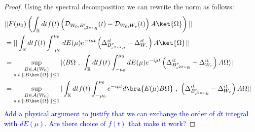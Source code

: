 \documentclass[a4paper,11pt]{article}
\theoremstyle{definition}
\theoremstyle{remark}
\newcommand{\lb}{\left(}
\newcommand{\rb}{\right)}
\newcommand{\NL}[1]{\textcolor{blue}{#1}}
\begin{document}
\begin{proof}
    Using the spectral decomposition we can rewrite the norm as follows:
    \begin{align}
        \begin{split}
            &||F(\mu_0)\lb\int_\mathbb{R} dt f(t)\lb \mathcal{D}_{W_0, B^r_{e^{2\pi s}R}}(t) - \mathcal{D}_{W_0, W_r}(t) \rb A\ket{\Omega}\rb||
            \\&= ||\int_\mathbb{R} dtf(t)\int_{-\mu_0}^{\mu_0}dE(\mu) e^{-i\mu t}\lb\Delta_{B^r_{e^{2\pi s}R}}^{it} - \Delta_{W_r}^{it}\rb A\ket{\Omega}||
            \\&
            =\sup_{\substack{B\in\mathcal{A}(W_0)\\s.t.||B\ket{\Omega}||\leq 1}}|\langle B\Omega\text{ , }\int_\mathbb{R}dt f(t)\int_{-\mu_0}^{\mu_0}dE(\mu)e^{-i\mu t}\lb\Delta_{B^r_{e^{2\pi s}R}}^{it} - \Delta_{W_r}^{it}\rb A\Omega\rangle|
            \\&
            =\sup_{\substack{B\in\mathcal{A}(W_0)\\ s.t.||B\ket{\Omega}||\leq 1}}|\int_\mathbb{R}dt f(t)\int_{-\mu_0}^{\mu_0}e^{-i\mu t}d\bra{E(\mu) B\Omega}\text{ , }\lb\Delta_{B^r_{e^{2\pi s}R}}^{it} - \Delta_{W_r}^{it}\rb A\Omega\rangle|
        \end{split}
    \end{align}
\NL{Add a physical argument to justify that we can exchange the order of $dt$ integral with $dE(\mu)$. Are there choice of $f(t)$ that make it work?}
    

\end{proof}
\end{document}
